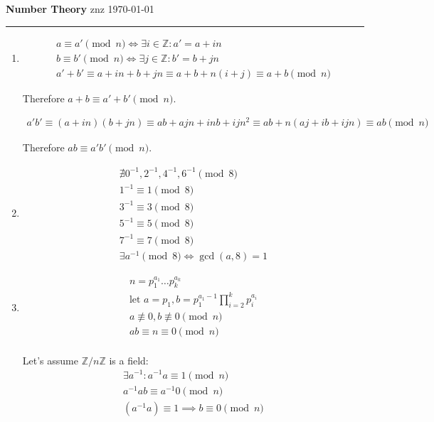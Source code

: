 \documentclass[12pt]{article}
\begin{document}
\noindent
{\large\bfseries Number Theory}
\hfill
znz
\quad
\today

\hrule
\medskip

\begin{enumerate}
  \item
        \[
        \begin{gathered}
          a \equiv a' \pmod{n} \iff \exists i \in \mathbb{Z} \colon a' = a + in \\
          b \equiv b' \pmod{n} \iff \exists j \in \mathbb{Z} \colon b' = b + jn \\
          a' + b' \equiv a + in + b + jn \equiv a + b + n(i + j) \equiv a + b \pmod{n}
        \end{gathered}
        \]

        Therefore $a + b \equiv a' + b' \pmod{n}$.

        \[
        \begin{gathered}
          a'b' \equiv (a + in)(b + jn) \equiv ab + ajn + inb + ijn^{2} \equiv ab + n(aj + ib + ijn) \equiv ab \pmod{n}
        \end{gathered}
        \]

        Therefore $ab \equiv a'b' \pmod{n}$.
  \item
        \[
        \begin{gathered}
          \nexists 0^{-1}, 2^{-1}, 4^{-1}, 6^{-1} \pmod{8} \\
          1^{-1} \equiv 1 \pmod{8} \\
          3^{-1} \equiv 3 \pmod{8} \\
          5^{-1} \equiv 5 \pmod{8} \\
          7^{-1} \equiv 7 \pmod{8} \\
          \exists a^{-1} \pmod{8} \iff \gcd(a, 8) = 1
        \end{gathered}
        \]
  \item
        \[
        \begin{gathered}
        n={p_{1}^{a_{1}} \ldots p_{k}^{a_{k}}} \\
        \text{let } a = p_{1}, b = p_{1}^{a_{1} - 1}\prod_{i=2}^{k}{p_{i}^{a_{i}}} \\
        a \not\equiv 0, b \not\equiv 0 \pmod{n} \\
        ab \equiv n \equiv 0 \pmod{n} \\
        \end{gathered}
        \]

        Let's assume $\mathbb{Z}/n\mathbb{Z}$ is a field:
        \[
        \begin{gathered}
          \exists a^{-1} \colon a^{-1}a \equiv 1 \pmod{n} \\
          a^{-1}ab \equiv a^{-1}0 \pmod{n} \\
          (a^{-1}a) \equiv 1 \implies b \equiv 0 \pmod{n}
        \end{gathered}
        \]


\end{enumerate}
\end{document}
